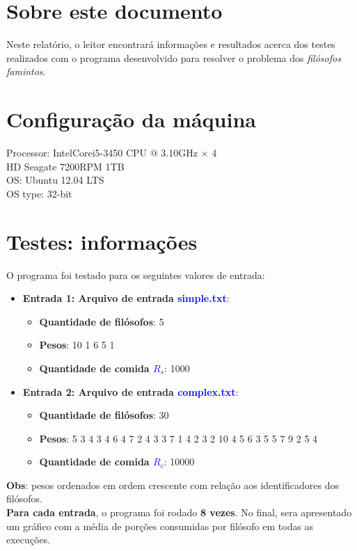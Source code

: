 \documentclass[11pt]{article}
\begin{document}
\section{Sobre este documento}
\indent\indent Neste relatório, o leitor encontrará informações e resultados acerca dos testes realizados com o programa desenvolvido para resolver o problema dos \textit{filósofos famintos}.

\section{Configuração da máquina}
Processor: Intel\textregistered Core\texttrademark i5-3450 CPU @ 3.10GHz $\times$ 4 \\
HD Seagate 7200RPM 1TB \\
OS: Ubuntu 12.04 LTS\\
OS type: 32-bit

\section{Testes: informações}

O programa foi testado para os seguintes valores de entrada:
\begin{itemize}
	\item \textbf{Entrada 1: Arquivo de entrada \textcolor{blue}{simple.txt}}:
	\begin{itemize}
		\item \textbf{Quantidade de filósofos}: 5
		\item \textbf{Pesos}: 10 1 6 5 1
		\item \textbf{Quantidade de comida \textcolor{blue}{$R_s$}}: 1000
	\end{itemize}
	\item \textbf{Entrada 2: Arquivo de entrada \textcolor{blue}{complex.txt}}:
	\begin{itemize}
		\item \textbf{Quantidade de filósofos}: 30
		\item \textbf{Pesos}: 5 3 4 3 4 6 4 7 2 4 3 3 7 1 4 2 3 2 10 4 5 6 3 5 5 7 9 2 5 4
		\item \textbf{Quantidade de comida \textcolor{blue}{$R_c$}}: 10000
	\end{itemize}
\end{itemize}

\noindent \textbf{Obs}: pesos ordenados em ordem crescente com relação aos identificadores dos filósofos. \\
\noindent \textbf{Para cada entrada}, o programa foi rodado \textbf{8 vezes}. No final, sera apresentado um gráfico com a média de porções consumidas por filósofo em todas as execuções.\\
\end{document}
